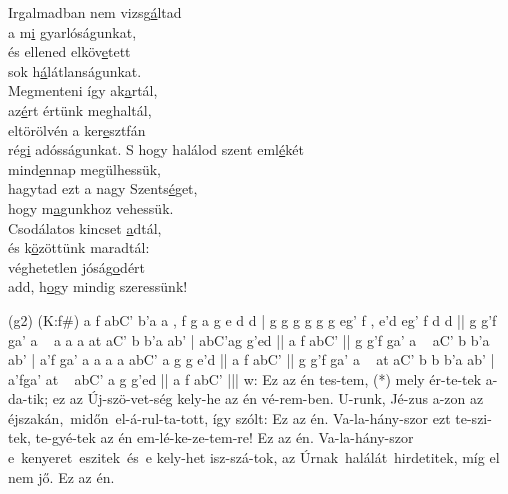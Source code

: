 \documentclass[twoside]{article}
\begin{document}
\begin{hymnstanzas}
  Irgalmadban nem vizsg\underline{á}ltad\\
  a m\underline{i} gyarlóságunkat,\\
  és ellened elköv\underline{e}tett\\
  sok h\underline{á}látlanságunkat.\\
  Megmenteni így ak\underline{a}rtál,\\
  az\underline{é}rt értünk meghaltál,\\
  eltörölvén a ker\underline{e}sztfán\\
  rég\underline{i} adósságunkat.
\stanzabreak
  S hogy halálod szent eml\underline{é}két\\
  mind\underline{e}nnap megülhessük,\\
  hagytad ezt a nagy Szents\underline{é}get,\\
  hogy m\underline{a}gunkhoz vehessük.\\
  Csodálatos kincset \underline{a}dtál,\\
  és k\underline{ö}zöttünk maradtál:\\
  véghetetlen jóság\underline{o}dért\\
  add, h\underline{o}gy mindig szeressünk!
\end{hymnstanzas}






\begin{aretino}
(g2) (K:f#) a f abC' b'a a , f g a g e d d | g g g g g g eg' f , e'd eg' f d d || g g'f ga' a ~ a a a at aC' b b'a ab' | abC'ag g'ed || a f abC' || g g'f ga' a ~ aC' b b'a ab' | a'f ga' a a a a abC' a g g e'd || a f abC' || g g'f ga' a ~ at aC' b b b'a ab' | a'fga' at ~ abC' a g g'ed || a f abC' |||
w: Ez az én tes-tem, (*) mely ér-te-tek a-da-tik; ez az Új-szö-vet-ség kely-he az én vé-rem-ben. U-runk, Jé-zus a-zon az éjszakán,~midőn~el-á-rul-ta-tott, így szólt: Ez az én. Va-la-hány-szor ezt te-szi-tek, te-gyé-tek az én em-lé-ke-ze-tem-re! Ez az én. Va-la-hány-szor e~kenyeret~eszitek~és~e kely-het isz-szá-tok, az Úrnak~halálát~hirdetitek, míg el nem jő. Ez az én.
\end{aretino}
\end{document}
